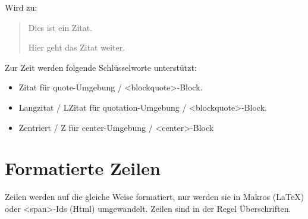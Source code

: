 \documentclass{scrartcl}
\begin{document}
Wird zu:

\begin{quote}
Dies ist ein Zitat.

Hier geht das Zitat weiter.

\end{quote}

Zur Zeit werden folgende Schlüsselworte unterstützt:

\begin{itemize}
\item Zitat für quote-Umgebung / <blockquote>-Block.
\item Langzitat / LZitat für quotation-Umgebung / <blockquote>-Block.
\item Zentriert / Z für center-Umgebung / <center>-Block

\end{itemize}

\section{Formatierte Zeilen}

Zeilen werden auf die gleiche Weise formatiert, nur werden sie in Makros (LaTeX) oder <span>-Ids (Html) umgewandelt. Zeilen sind in der Regel Überschriften.
\end{document}
